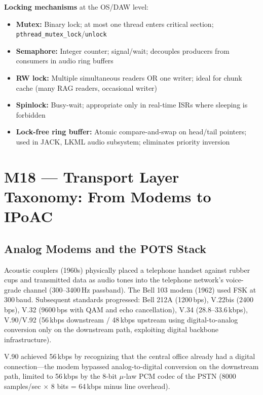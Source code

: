 \documentclass[11pt,letterpaper]{article}
\begin{document}
\textbf{Locking mechanisms} at the OS/DAW level:
\begin{itemize}[noitemsep]
  \item \textbf{Mutex:} Binary lock; at most one thread enters critical section; \texttt{pthread\_mutex\_lock}/\texttt{unlock}
  \item \textbf{Semaphore:} Integer counter; signal/wait; decouples producers from consumers in audio ring buffers
  \item \textbf{RW lock:} Multiple simultaneous readers OR one writer; ideal for chunk cache (many RAG readers, occasional writer)
  \item \textbf{Spinlock:} Busy-wait; appropriate only in real-time ISRs where sleeping is forbidden
  \item \textbf{Lock-free ring buffer:} Atomic compare-and-swap on head/tail pointers; used in JACK, LKML audio subsystem; eliminates priority inversion
\end{itemize}

\newpage

\section{M18 — Transport Layer Taxonomy: From Modems to IPoAC}

\subsection{Analog Modems and the POTS Stack}

Acoustic couplers (1960s) physically placed a telephone handset against rubber cups and transmitted data as audio tones into the telephone network's voice-grade channel (300--3400\,Hz passband). The Bell 103 modem (1962) used FSK at 300\,baud. Subsequent standards progressed: Bell 212A (1200\,bps), V.22bis (2400\,bps), V.32 (9600\,bps with QAM and echo cancellation), V.34 (28.8--33.6\,kbps), V.90/V.92 (56\,kbps downstream / 48\,kbps upstream using digital-to-analog conversion only on the downstream path, exploiting digital backbone infrastructure).

V.90 achieved 56\,kbps by recognizing that the central office already had a digital connection---the modem bypassed analog-to-digital conversion on the downstream path, limited to 56\,kbps by the 8-bit $\mu$-law PCM codec of the PSTN (8000 samples/sec $\times$ 8 bits = 64\,kbps minus line overhead).
\end{document}
